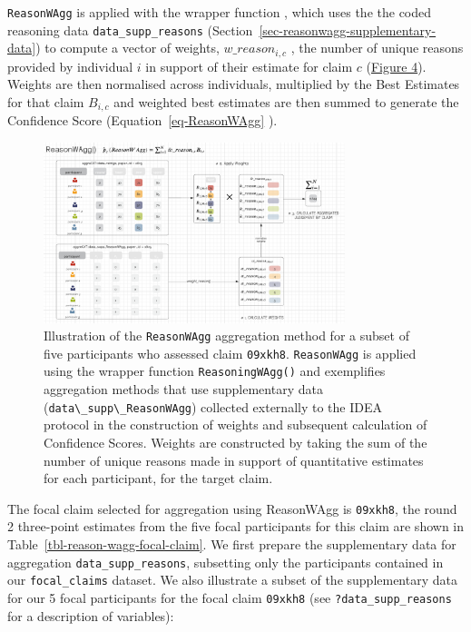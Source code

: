 \documentclass[article]{jss}
\newcommand{\fct}[1]{\code{#1()}}
\begin{document}
\texttt{ReasonWAgg} is applied with the wrapper function
\fct{ReasoningWAgg}, which uses the the coded reasoning data
\texttt{data\_supp\_reasons}
(Section~\ref{sec-reasonwagg-supplementary-data}) to compute a vector of
weights, \(w\_reason_{i,c}\) , the number of unique reasons provided by
individual \(i\) in support of their estimate for claim \(c\)
(\protect\hyperlink{fig-ReasonWAgg}{Figure 4}). Weights are then
normalised across individuals, multiplied by the Best Estimates for that
claim \(B_{i,c}\) and weighted best estimates are then summed to
generate the Confidence Score (Equation~\ref{eq-ReasonWAgg} ).

\begin{figure}

{\centering \includegraphics[width=3.46in,height=\textheight]{images/img_ReasonWAgg.png}

}

\caption{\label{fig-ReasonWAgg}Illustration of the \texttt{ReasonWAgg}
aggregation method for a subset of five participants who assessed claim
\texttt{09xkh8}. \texttt{ReasonWAgg} is applied using the wrapper
function \texttt{ReasoningWAgg()} and exemplifies aggregation methods
that use supplementary data
(\texttt{data\textbackslash{}\_supp\textbackslash{}\_ReasonWAgg})
collected externally to the IDEA protocol in the construction of weights
and subsequent calculation of Confidence Scores. Weights are constructed
by taking the sum of the number of unique reasons made in support of
quantitative estimates for each participant, for the target claim.}

\end{figure}

The focal claim selected for aggregation using ReasonWAgg is
\texttt{09xkh8}, the round 2 three-point estimates from the five focal
participants for this claim are shown in
Table~\ref{tbl-reason-wagg-focal-claim}. We first prepare the
supplementary data for aggregation \texttt{data\_supp\_reasons},
subsetting only the participants contained in our \texttt{focal\_claims}
dataset. We also illustrate a subset of the supplementary data for our 5
focal participants for the focal claim \texttt{09xkh8} (see
\texttt{?data\_supp\_reasons} for a description of variables):
\end{document}
